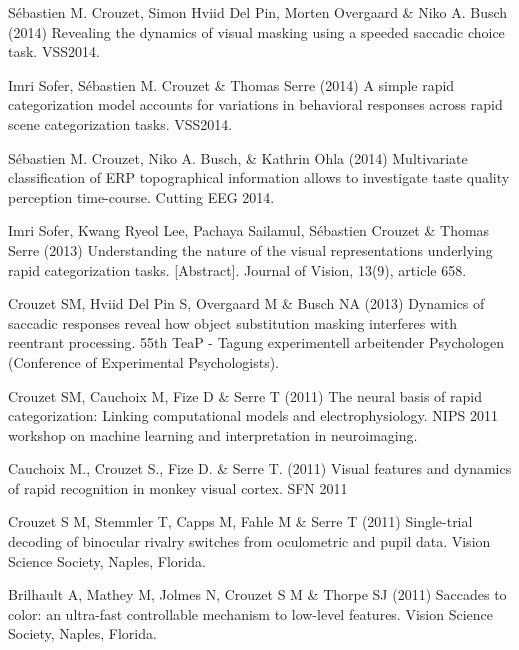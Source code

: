\documentclass[margin,line]{resume}
\begin{document}
\begin{resume}
\vspace{-2mm} Sébastien M. Crouzet, Simon Hviid Del Pin, Morten Overgaard \& Niko A. Busch (2014) Revealing the dynamics of visual masking using a speeded saccadic choice task. VSS2014.

\vspace{-2mm} Imri Sofer, Sébastien M. Crouzet \& Thomas Serre (2014) A simple rapid categorization model accounts for variations in behavioral responses across rapid scene categorization tasks. VSS2014.

\vspace{-2mm} Sébastien M. Crouzet, Niko A. Busch, \& Kathrin Ohla (2014) Multivariate classification of ERP topographical information allows to investigate taste quality perception time-course. Cutting EEG 2014.

\vspace{-2mm} Imri Sofer, Kwang Ryeol Lee, Pachaya Sailamul, Sébastien Crouzet \& Thomas Serre (2013) Understanding the nature of the visual representations underlying rapid categorization tasks.  [Abstract]. Journal of Vision, 13(9), article 658.

\vspace{-2mm} Crouzet SM, Hviid Del Pin S, Overgaard M \& Busch NA (2013) Dynamics of saccadic responses reveal how object substitution masking interferes with reentrant processing. 55th TeaP - Tagung experimentell arbeitender Psychologen (Conference of Experimental Psychologists).

\vspace{-2mm} Crouzet SM, Cauchoix M, Fize D \& Serre T (2011) The neural basis of rapid categorization: Linking computational models and electrophysiology. NIPS 2011 workshop on machine learning and interpretation in neuroimaging.

\vspace{-2mm} Cauchoix M., Crouzet S., Fize D. \& Serre T. (2011) Visual features and dynamics of rapid recognition in monkey visual cortex. SFN 2011

\vspace{-2mm} Crouzet S M, Stemmler T, Capps M, Fahle M \& Serre T (2011) Single-trial decoding of binocular rivalry switches from oculometric and pupil data. Vision Science Society, Naples, Florida.

\vspace{-2mm} Brilhault A, Mathey M, Jolmes N, Crouzet S M \& Thorpe SJ (2011) Saccades to color: an ultra-fast controllable mechanism to low-level features. Vision Science Society, Naples, Florida.


\end{resume}
\end{document}
